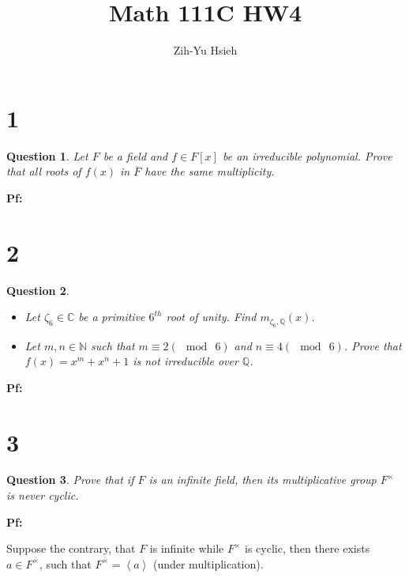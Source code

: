 \documentclass{article}
\title{Math 111C HW4}
\author{Zih-Yu Hsieh}
\newtheorem{question}{Question}
\begin{document}
\maketitle

\section*{1}
\begin{myBox}[]{}
    \begin{question}
        Let $F$ be a field and $f\in F[x]$ be an irreducible polynomial. Prove that all roots of $f(x)$ in $\overline{F}$ have the same multiplicity.
    \end{question}
\end{myBox}

\textbf{Pf:}

\break

\section*{2}
\begin{myBox}[]{}
    \begin{question}
        \begin{itemize}
            \item[(a)] Let $\zeta_6\in\mathbb{C}$ be a primitive $6^{th}$ root of unity. Find $m_{\zeta_6,\mathbb{Q}}(x)$.
            \item[(b)] Let $m,n\in\mathbb{N}$ such that $m\equiv 2(\mod\ 6)$ and $n\equiv 4(\mod\ 6)$. Prove that $f(x)=x^m+x^n+1$ is not irreducible over $\mathbb{Q}$. 
        \end{itemize}
    \end{question}
\end{myBox}

\textbf{Pf:}

\break

\section*{3}
\begin{myBox}[]{}
    \begin{question}
        Prove that if $F$ is an infinite field, then its multiplicative group $F^\times$ is never cyclic.
    \end{question}
\end{myBox}

\textbf{Pf:}

Suppose the contrary, that $F$ is infinite while $F^\times$ is cyclic, then there exists $a\in F^\times$, such that $F^\times = \left<a\right>$ (under multiplication).
\end{document}
